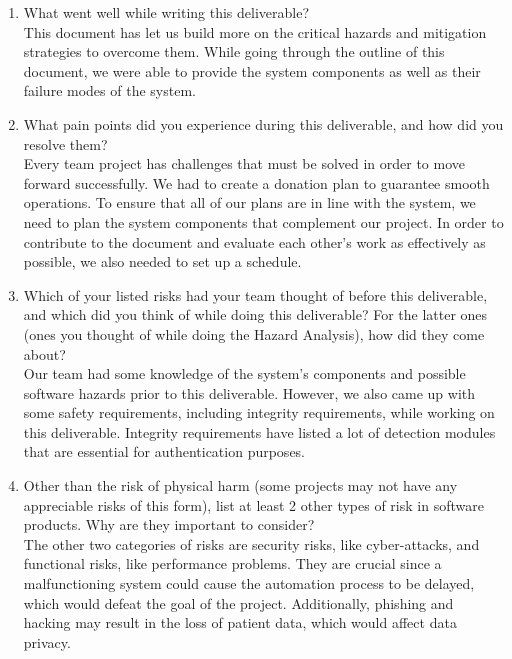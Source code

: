 \documentclass{article}
\begin{document}
\begin{enumerate}
    \item What went well while writing this deliverable?\\
    This document has let us build more on the critical hazards and mitigation strategies to overcome them. While going through the outline of this document, we were able to provide the system components as well as their failure modes of the system. 
    
    \item What pain points did you experience during this deliverable, and how did you resolve them?\\
    Every team project has challenges that must be solved in order to move forward successfully. We had to create a donation plan to guarantee smooth operations. To ensure that all of our plans are in line with the system, we need to plan the system components that complement our project. In order to contribute to the document and evaluate each other's work as effectively as possible, we also needed to set up a schedule.

    \item Which of your listed risks had your team thought of before this deliverable, and which did you think of while doing this deliverable? For the latter ones (ones you thought of while doing the Hazard Analysis), how did they come about?\\
    Our team had some knowledge of the system's components and possible software hazards prior to this deliverable. However, we also came up with some safety requirements, including integrity requirements, while working on this deliverable. Integrity requirements have listed a lot of detection modules that are essential for authentication purposes.
    
    \item Other than the risk of physical harm (some projects may not have any appreciable risks of this form), list at least 2 other types of risk in software products. Why are they important to consider?\\
    The other two categories of risks are security risks, like cyber-attacks, and functional risks, like performance problems. They are crucial since a malfunctioning system could cause the automation process to be delayed, which would defeat the goal of the project. Additionally, phishing and hacking may result in the loss of patient data, which would affect data privacy. 

\end{enumerate}
\end{document}
